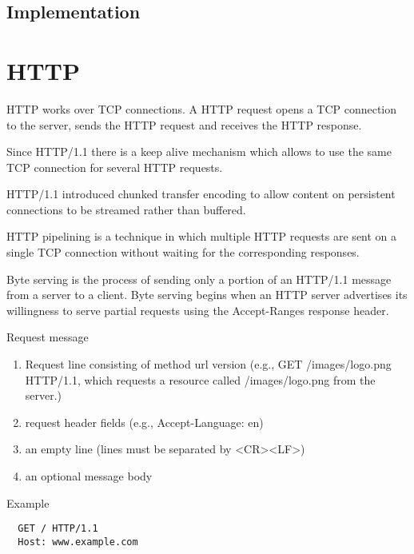 \subsection{Implementation}


\section{HTTP}

HTTP works over TCP connections. A HTTP request opens a TCP connection to the
server, sends the HTTP request and receives the HTTP response.

Since HTTP/1.1 there is a keep alive mechanism which allows to use the same
TCP connection for several HTTP requests.

HTTP/1.1 introduced chunked transfer encoding to allow content on persistent
connections to be streamed rather than buffered.

HTTP pipelining is a technique in which multiple HTTP requests are sent on a
single TCP connection without waiting for the corresponding responses.

Byte serving is the process of sending only a portion of an HTTP/1.1 message
from a server to a client. Byte serving begins when an HTTP server advertises
its willingness to serve partial requests using the Accept-Ranges response
header.

\noindent Request message
\begin{enumerate}
\item Request line consisting of method url version (e.g., GET
  /images/logo.png HTTP/1.1, which requests a resource called /images/logo.png
  from the server.)

\item request header fields (e.g., Accept-Language: en)

\item an empty line (lines must be separated by <CR><LF>)

\item an optional message body
\end{enumerate}
%
Example
{\small
\begin{verbatim}
  GET / HTTP/1.1
  Host: www.example.com
\end{verbatim}
}


